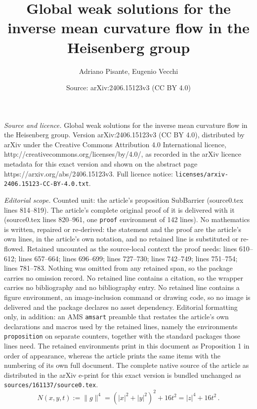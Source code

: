 \documentclass[10pt,a4paper]{amsart}
\title{Global weak solutions for the inverse mean curvature flow in the Heisenberg group}
\author{Adriano Pisante, Eugenio Vecchi}
\date{Source: arXiv:2406.15123v3 (CC BY 4.0)}
\begin{document}
\maketitle

\noindent\emph{Source and licence.} Global weak solutions for the inverse mean curvature flow in the Heisenberg group. Version arXiv:2406.15123v3 (CC BY 4.0), distributed by arXiv under the Creative Commons Attribution 4.0 International licence, http://creativecommons.org/licenses/by/4.0/, as recorded in the arXiv licence metadata for this exact version and shown on the abstract page https://arxiv.org/abs/2406.15123v3. Full licence notice: \texttt{licenses/arxiv-2406.15123-CC-BY-4.0.txt}.\par\smallskip

\noindent\textit{Editorial scope.} Counted unit: the article's proposition SubBarrier (source0.tex lines 814--819). The article's complete original proof of it is delivered with it (source0.tex lines 820--961, one \texttt{proof} environment of 142 lines). No mathematics is written, repaired or re-derived: the statement and the proof are the article's own lines, in the article's own notation, and no retained line is substituted or re-flowed.  Retained uncounted as the source-local context the proof needs: lines 610--612; lines 657--664; lines 696--699; lines 727--730; lines 742--749; lines 751--754; lines 781--783.  Nothing was omitted from any retained span, so the package carries no omission record.  No retained line contains a citation, so the wrapper carries no bibliography and no bibliography entry.  No retained line contains a figure environment, an image-inclusion command or drawing code, so no image is delivered and the package declares no asset dependency.  Editorial formatting only, in addition: an AMS \texttt{amsart} preamble that restates the article's own declarations and macros used by the retained lines, namely the environments \texttt{proposition} on separate counters, together with the standard packages those lines need.  The retained environments print in this document as Proposition 1 in order of appearance, whereas the article prints the same items with the numbering of its own full document.  The complete native source of the article as distributed in the arXiv e-print for this exact version is bundled unchanged as \texttt{sources/161137/source0.tex}.
\begin{equation}\label{N}
N(x,y,t):= \| g\|^4= \left(|x|^2 + |y|^2\right)^2 + 16 t^2 = |z|^4 +16t^2 \, .
\end{equation}
\end{document}
